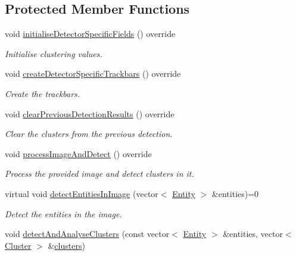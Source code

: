 \subsection*{Protected Member Functions}
\begin{DoxyCompactItemize}
\item 
void \hyperlink{classmultiscale_1_1analysis_1_1ClusterDetector_a67751dd6e21750019a20648b6ba3c8f2}{initialise\-Detector\-Specific\-Fields} () override
\begin{DoxyCompactList}\small\item\em Initialise clustering values. \end{DoxyCompactList}\item 
void \hyperlink{classmultiscale_1_1analysis_1_1ClusterDetector_a7877cc5364f576e6a9cd96a6cd528cfc}{create\-Detector\-Specific\-Trackbars} () override
\begin{DoxyCompactList}\small\item\em Create the trackbars. \end{DoxyCompactList}\item 
void \hyperlink{classmultiscale_1_1analysis_1_1ClusterDetector_a5679e30f1ea35203963bf2baa8d7ed36}{clear\-Previous\-Detection\-Results} () override
\begin{DoxyCompactList}\small\item\em Clear the clusters from the previous detection. \end{DoxyCompactList}\item 
void \hyperlink{classmultiscale_1_1analysis_1_1ClusterDetector_a736847233c57cfa59abb953f70ef9209}{process\-Image\-And\-Detect} () override
\begin{DoxyCompactList}\small\item\em Process the provided image and detect clusters in it. \end{DoxyCompactList}\item 
virtual void \hyperlink{classmultiscale_1_1analysis_1_1ClusterDetector_a115f47c1f0855886ef5ca48acc111843}{detect\-Entities\-In\-Image} (vector$<$ \hyperlink{classmultiscale_1_1analysis_1_1Entity}{Entity} $>$ \&entities)=0
\begin{DoxyCompactList}\small\item\em Detect the entities in the image. \end{DoxyCompactList}\item 
void \hyperlink{classmultiscale_1_1analysis_1_1ClusterDetector_a46f98e066e74171774f0b6728118bc7b}{detect\-And\-Analyse\-Clusters} (const vector$<$ \hyperlink{classmultiscale_1_1analysis_1_1Entity}{Entity} $>$ \&entities, vector$<$ \hyperlink{classmultiscale_1_1analysis_1_1Cluster}{Cluster} $>$ \&\hyperlink{classmultiscale_1_1analysis_1_1ClusterDetector_aa81a8649bc743389c2fc1919d47eb5b3}{clusters})

\end{DoxyCompactItemize}
